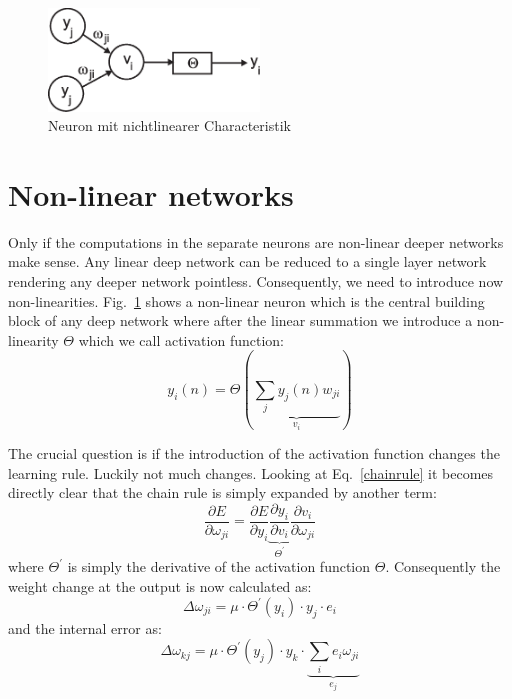 \documentclass[12pt]{article}
\begin{document}
\begin{figure}[!hbt]
\begin{center}
\mbox{\includegraphics[width=0.5\textwidth]{nonlin}}
\end{center}
\caption{Neuron mit nichtlinearer Characteristik
\label{nonlin}}
\end{figure}

\section{Non-linear networks}
Only if the computations in the separate neurons are non-linear
deeper networks make sense. Any linear deep network can be
reduced to a single layer network rendering any deeper network
pointless. Consequently, we need to introduce now non-linearities.
Fig.~\ref{nonlin} shows a non-linear neuron which is the central building block
of any deep network where after the linear summation we introduce a non-linearity $\Theta$
which we call activation function:
\begin{equation}
  y_i(n) = \Theta\left(\underbrace{\sum_j y_j(n) w_{ji}}_{v_i} \right) \label{nonlinear_sum}
\end{equation}

The crucial question is if the introduction of the activation function
changes the learning rule. Luckily not much changes.
Looking at Eq.~\ref{chainrule} it becomes directly clear that the
chain rule is simply expanded by another term:
 \begin{equation}
 \frac{\partial E}{\partial \omega_{ji}}  = \frac{\partial E}{\partial y_i} \underbrace{\frac{\partial y_i}{\partial v_i}}_{\Theta^\prime} \frac{\partial v_i}{\partial \omega_{ji}}
 \end{equation}
 where $\Theta^\prime$ is simply the derivative of the activation function $\Theta$. Consequently the
 weight change at the output is now calculated as:
\begin{equation}
  \Delta\omega_{ji} = \mu \cdot \Theta^\prime(y_i) \cdot y_j \cdot e_i 
\end{equation}
and the internal error as:
\begin{equation}
\Delta\omega_{kj} = \mu \cdot \Theta^\prime(y_j) \cdot y_k \cdot \underbrace{\sum_i e_i \omega_{ji}}_{e_j} 
\end{equation}
\end{document}
